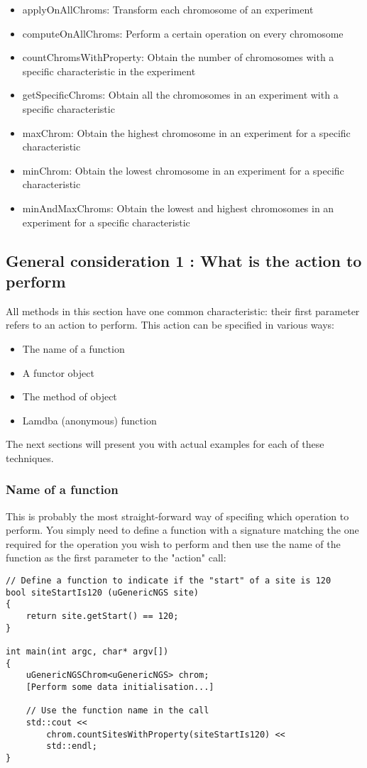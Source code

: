 \documentclass[letterpaper,10pt]{article}
\begin{document}
\begin{itemize}
\begin{itemize}
    \item applyOnAllChroms: Transform each chromosome of an experiment
    \item computeOnAllChroms: Perform a certain operation on every chromosome
    \item countChromsWithProperty: Obtain the number of chromosomes with a specific characteristic in the experiment
    \item getSpecificChroms: Obtain all the chromosomes in an experiment with a specific characteristic
    \item maxChrom: Obtain the highest chromosome in an experiment for a specific characteristic
    \item minChrom: Obtain the lowest chromosome in an experiment for a specific characteristic
    \item minAndMaxChroms: Obtain the lowest and highest chromosomes in an experiment for a specific characteristic
  \end{itemize}
\end{itemize}

\subsection{General consideration 1 : What is the action to perform}
All methods in this section have one common characteristic: their first parameter refers to an action to perform. This action can be specified in various ways:
\begin{itemize}
 \item The name of a function
 \item A functor object
 \item The method of object
 \item Lamdba (anonymous) function
\end{itemize}

The next sections will present you with actual examples for each of these techniques.

\subsubsection{Name of a function}
This is probably the most straight-forward way of specifing which operation to perform. You simply need to define a function with a signature matching the one required for the operation you wish to perform and then use the name of the function as the first parameter to the "action" call:
\begin{verbatim}
// Define a function to indicate if the "start" of a site is 120
bool siteStartIs120 (uGenericNGS site)
{
    return site.getStart() == 120;
}

int main(int argc, char* argv[])
{
    uGenericNGSChrom<uGenericNGS> chrom;
    [Perform some data initialisation...]

    // Use the function name in the call
    std::cout << 
        chrom.countSitesWithProperty(siteStartIs120) << 
        std::endl;
}
\end{verbatim}
\end{document}

